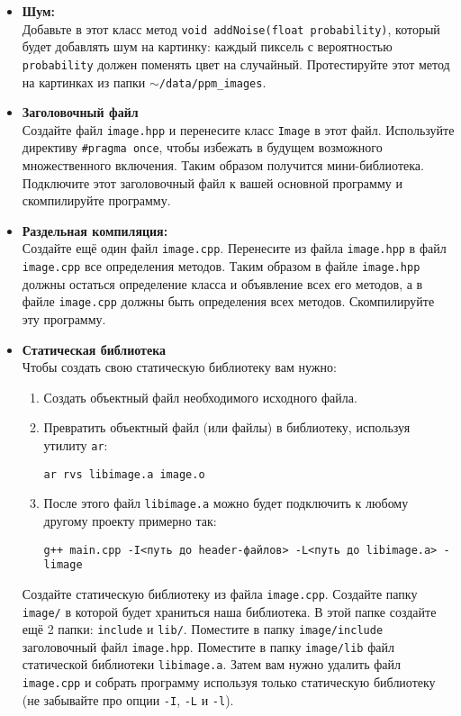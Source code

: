 \documentclass{article}
\begin{document}
\begin{itemize}
\item \textbf{Шум:}\\
Добавьте в этот класс метод \texttt{void addNoise(float probability)}, который будет добавлять шум на картинку: каждый пиксель с вероятностью \texttt{probability} должен поменять цвет на случайный. Протестируйте этот метод на картинках из папки \texttt{$\sim$/data/ppm\_images}.

\item \textbf{Заголовочный файл} \\
Создайте файл \texttt{image.hpp} и перенесите класс \texttt{Image} в этот файл. Используйте директиву \texttt{\#pragma once}, чтобы избежать в будущем возможного множественного включения. Таким образом получится мини-библиотека. Подключите этот заголовочный файл к вашей основной программу и скомпилируйте программу.

\item \textbf{Раздельная компиляция:} \\
Создайте ещё один файл \texttt{image.cpp}. Перенесите из файла \texttt{image.hpp} в файл \texttt{image.cpp} все определения методов. Таким образом в файле \texttt{image.hpp} должны остаться определение класса и объявление всех его методов, а в файле \texttt{image.cpp} должны быть определения всех методов. Скомпилируйте эту программу.

\item \textbf{Статическая библиотека} \\
Чтобы создать свою статическую библиотеку вам нужно:
\begin{enumerate}
\item Создать объектный файл необходимого исходного файла.
\item Превратить объектный файл (или файлы) в библиотеку, используя утилиту \texttt{ar}:
\begin{verbatim}
ar rvs libimage.a image.o
\end{verbatim}
\item После этого файл \texttt{libimage.a} можно будет подключить к любому другому проекту примерно так:
\begin{verbatim}
g++ main.cpp -I<путь до header-файлов> -L<путь до libimage.a> -limage
\end{verbatim}
\end{enumerate}
Создайте статическую библиотеку из файла \texttt{image.cpp}. Создайте папку \texttt{image/} в которой будет храниться наша библиотека. В этой папке создайте ещё 2 папки: \texttt{include} и \texttt{lib/}. Поместите в папку \texttt{image/include} заголовочный файл \texttt{image.hpp}. Поместите в папку \texttt{image/lib} файл статической библиотеки \texttt{libimage.a}. Затем вам нужно удалить файл \texttt{image.cpp} и собрать программу используя только статическую библиотеку (не забывайте про опции \texttt{-I}, \texttt{-L} и \texttt{-l}).



\end{itemize}
\end{document}
